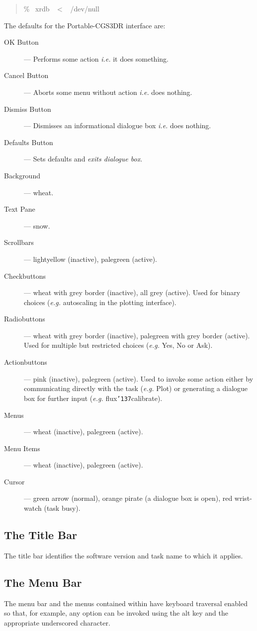 \documentclass[a4paper]{book}
\renewcommand{\_}{{\tt\char'137}}
\begin{document}
\begin{quote}
 \% \ xrdb \ $<$ \ /dev/null \\
\end{quote}

The defaults for the Portable-CGS3DR interface are:
\begin{description}
\item[{\sf OK Button}] --- Performs some action {\em i.e.} it does something.
\item[{\sf Cancel Button}] --- Aborts some menu without action {\em i.e.} does nothing.
\item[{\sf Dismiss Button}] --- Dismisses an informational dialogue box {\em i.e.} does nothing.
\item[{\sf Defaults Button}] --- Sets defaults and {\em exits dialogue box}.
\item[{\sf Background}] --- wheat.
\item[{\sf Text Pane}] --- snow.
\item[{\sf Scrollbars}] --- lightyellow (inactive), palegreen (active). 
\item[{\sf Checkbuttons}] --- wheat with grey border (inactive), all grey (active). Used
for binary choices ({\em e.g.} autoscaling in the plotting interface).
\item[{\sf Radiobuttons}] --- wheat with grey border (inactive), palegreen with grey border (active).
Used for multiple but restricted choices ({\em e.g.} {\sf Yes}, {\sf No} or {\sf Ask}).
\item[{\sf Actionbuttons}] --- pink (inactive), palegreen (active). Used to invoke some action
either by communicating directly with the task ({\em e.g.} Plot) or generating a dialogue box
for further input ({\em e.g.} flux\_calibrate).
\item[{\sf Menus}] --- wheat (inactive), palegreen (active).
\item[{\sf Menu Items}] --- wheat (inactive), palegreen (active). 
\item[{\sf Cursor}] --- green arrow (normal), orange pirate (a dialogue box is open), red wrist-watch (task busy).
\end{description}

\subsection{The Title Bar}
The title bar identifies the software version and task name to which it applies.

\subsection{The Menu Bar}
The menu bar and the menus contained within have keyboard traversal enabled so that, for example, any option
can be invoked using the {\sc alt} key and the appropriate underscored character.
\end{document}
